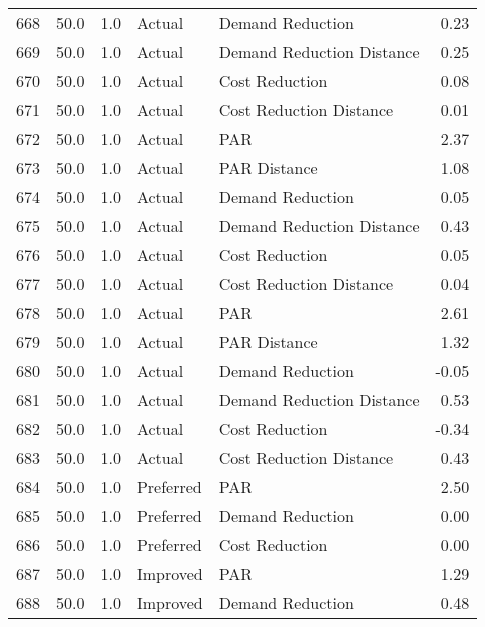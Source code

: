 \begin{longtable}{lrrllr}
668  &         50.0 &     1.0 &         Actual &           Demand Reduction &   0.23 \\
669  &         50.0 &     1.0 &         Actual &  Demand Reduction Distance &   0.25 \\
670  &         50.0 &     1.0 &         Actual &             Cost Reduction &   0.08 \\
671  &         50.0 &     1.0 &         Actual &    Cost Reduction Distance &   0.01 \\
672  &         50.0 &     1.0 &         Actual &                        PAR &   2.37 \\
673  &         50.0 &     1.0 &         Actual &               PAR Distance &   1.08 \\
674  &         50.0 &     1.0 &         Actual &           Demand Reduction &   0.05 \\
675  &         50.0 &     1.0 &         Actual &  Demand Reduction Distance &   0.43 \\
676  &         50.0 &     1.0 &         Actual &             Cost Reduction &   0.05 \\
677  &         50.0 &     1.0 &         Actual &    Cost Reduction Distance &   0.04 \\
678  &         50.0 &     1.0 &         Actual &                        PAR &   2.61 \\
679  &         50.0 &     1.0 &         Actual &               PAR Distance &   1.32 \\
680  &         50.0 &     1.0 &         Actual &           Demand Reduction &  -0.05 \\
681  &         50.0 &     1.0 &         Actual &  Demand Reduction Distance &   0.53 \\
682  &         50.0 &     1.0 &         Actual &             Cost Reduction &  -0.34 \\
683  &         50.0 &     1.0 &         Actual &    Cost Reduction Distance &   0.43 \\
684  &         50.0 &     1.0 &      Preferred &                        PAR &   2.50 \\
685  &         50.0 &     1.0 &      Preferred &           Demand Reduction &   0.00 \\
686  &         50.0 &     1.0 &      Preferred &             Cost Reduction &   0.00 \\
687  &         50.0 &     1.0 &       Improved &                        PAR &   1.29 \\
688  &         50.0 &     1.0 &       Improved &           Demand Reduction &   0.48 \\

\end{longtable}
